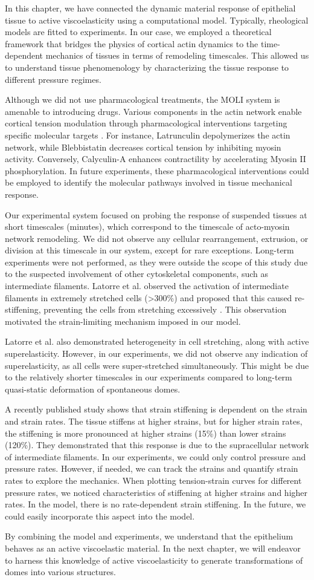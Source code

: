 In this chapter, we have connected the dynamic material response of
epithelial tissue to active viscoelasticity using a computational model.
Typically, rheological models are fitted to experiments. In our case, we
employed a theoretical framework that bridges the physics of cortical
actin dynamics to the time-dependent mechanics of tissues in terms of
remodeling timescales. This allowed us to understand tissue
phenomenology by characterizing the tissue response to different
pressure regimes.

Although we did not use pharmacological treatments, the MOLI system is
amenable to introducing drugs. Various components in the actin network
enable cortical tension modulation through pharmacological interventions
targeting specific molecular targets \cite{cartagena-rivera2016}.
For instance, Latrunculin depolymerizes the actin network, while
Blebbistatin decreases cortical tension by inhibiting myosin activity.
Conversely, Calyculin-A enhances contractility by accelerating Myosin II
phosphorylation. In future experiments, these pharmacological
interventions could be employed to identify the molecular pathways
involved in tissue mechanical response.

Our experimental system focused on probing the response of suspended
tissues at short timescales (minutes), which correspond to the timescale
of acto-myosin network remodeling. We did not observe any cellular
rearrangement, extrusion, or division at this timescale in our system,
except for rare exceptions. Long-term experiments were not performed, as
they were outside the scope of this study due to the suspected
involvement of other cytoskeletal components, such as intermediate
filaments. Latorre et al. observed the activation of intermediate
filaments in extremely stretched cells (\textgreater300\%) and proposed
that this caused re-stiffening, preventing the cells from stretching
excessively \cite{latorre2018}. This observation motivated the strain-limiting mechanism
imposed in our model.

Latorre et al. also demonstrated heterogeneity in cell stretching, along
with active superelasticity. However, in our experiments, we did not
observe any indication of superelasticity, as all cells were
super-stretched simultaneously. This might be due to the relatively
shorter timescales in our experiments compared to long-term quasi-static
deformation of spontaneous domes.

A recently published study \cite{duque2023} shows that strain
stiffening is dependent on the strain and strain rates. The tissue
stiffens at higher strains, but for higher strain rates, the stiffening
is more pronounced at higher strains (15\%) than lower strains (120\%).
They demonstrated that this response is due to the supracellular network
of intermediate filaments. In our experiments, we could only control
pressure and pressure rates. However, if needed, we can track the
strains and quantify strain rates to explore the mechanics. When
plotting tension-strain curves for different pressure rates, we noticed
characteristics of stiffening at higher strains and higher rates. In the
model, there is no rate-dependent strain stiffening. In the future, we
could easily incorporate this aspect into the model.

By combining the model and experiments, we understand that the
epithelium behaves as an active viscoelastic material. In the next
chapter, we will endeavor to harness this knowledge of active
viscoelasticity to generate transformations of domes into various
structures.
